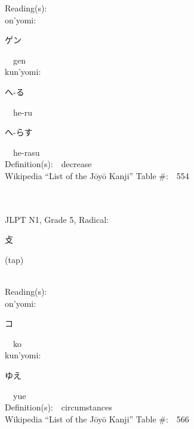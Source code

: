 \begin{multicols}{2}
Reading(s):\ \ \\
{\hspace*{1em}}on'yomi:\ \ \\
{\hspace*{2em}}{\begin{CJK}{UTF8}{min} ゲン \end{CJK}}\ \ gen\ \ \\
{\hspace*{1em}}kun'yomi:\ \ \\
{\hspace*{2em}}{\begin{CJK}{UTF8}{min} へ-る \end{CJK}}\ \ he-ru\ \ \\
{\hspace*{2em}}{\begin{CJK}{UTF8}{min} へ-らす \end{CJK}}\ \ he-rasu\ \ \\
Definition(s):\ \ decrease \\
Wikipedia ``List of the J\=oy\=o Kanji'' Table \#:\ \ 554 \\
\ \ \\
{\fontsize{34pt}{40pt}  }\ \ \\  %
{JLPT N1, Grade 5, Radical:\ \ {\begin{CJK}{UTF8}{min} 攴 \end{CJK}} (tap) } \\
Reading(s):\ \ \\
{\hspace*{1em}}on'yomi:\ \ \\
{\hspace*{2em}}{\begin{CJK}{UTF8}{min} コ \end{CJK}}\ \ ko\ \ \\
{\hspace*{1em}}kun'yomi:\ \ \\
{\hspace*{2em}}{\begin{CJK}{UTF8}{min} ゆえ \end{CJK}}\ \ yue\ \ \\
Definition(s):\ \ circumstances \\
Wikipedia ``List of the J\=oy\=o Kanji'' Table \#:\ \ 566 \\
\ \ \\

\end{multicols}
